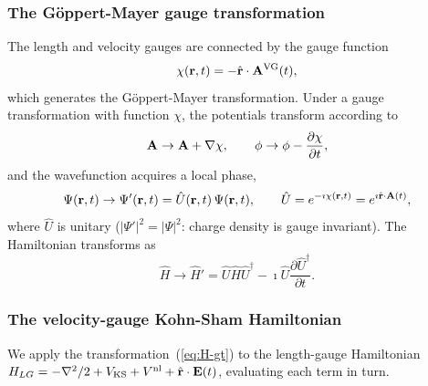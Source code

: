 {{{{{%
\subsubsection{The G\"{o}ppert-Mayer gauge transformation}
\label{sec:GM}

The length and velocity gauges are connected by the gauge function
\begin{equation}
  \chi(\mathbf{r},t) = -\hat{\mathbf{r}}\cdot\mathbf{A}^\mathrm{VG}(t),
  \label{eq:chi}
\end{equation}
which generates the G\"{o}ppert-Mayer
transformation.\cite{goeppert-mayer-1931}
Under a gauge transformation with function $\chi$, the potentials
transform according to
\begin{equation}
  \mathbf{A}\to\mathbf{A}+\nabla\chi,
  \qquad
  \phi\to\phi-\frac{\partial\chi}{\partial t},
  \label{eq:gauge-rules}
\end{equation}
and the wavefunction acquires a local phase,
\begin{equation}
  \Psi(\mathbf{r},t)
  \to \Psi'(\mathbf{r},t)
  = \hat{U}(\mathbf{r},t)\,\Psi(\mathbf{r},t),
  \qquad
  \hat{U} = e^{-\imath\chi(\mathbf{r},t)}
           = e^{\imath\hat{\mathbf{r}}\cdot\mathbf{A}(t)},
  \label{eq:psi-gt}
\end{equation}
where $\hat{U}$ is unitary ($|\Psi'|^2=|\Psi|^2$: charge density
is gauge invariant).
The Hamiltonian transforms as
\begin{equation}
  \hat{H}
  \to \hat{H}'
  = \hat{U}\hat{H}\hat{U}^\dagger
    - \imath\hat{U}\frac{\partial\hat{U}^\dagger}{\partial t}.
  \label{eq:H-gt}
\end{equation}


\subsubsection{The velocity-gauge Kohn-Sham Hamiltonian}
\label{sec:H-VG}

We apply the transformation~(\ref{eq:H-gt}) to the length-gauge
Hamiltonian
$H_{LG} = -\nabla^2/2 + V_\mathrm{KS} + V^{\mathrm{nl}}
+ \hat{\mathbf{r}}\cdot\mathbf{E}(t)$,
evaluating each term in turn.

}}}}}
